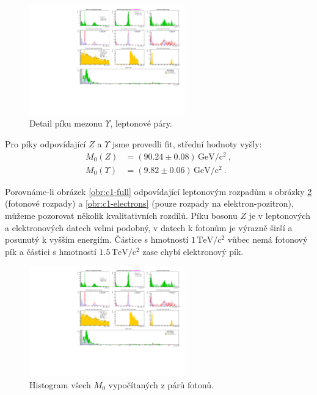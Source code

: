\documentclass[10pt,a4paper]{article}
\renewcommand{\U}[1]{\ensuremath{\,\mathrm{#1}}}
\newcommand{\°}{\degree}
\begin{document}
\begin{figure}[h]
    \centering
    \includegraphics[width=0.6\textwidth]{c1_Y.pdf}
    \vspace{-\baselineskip}
    \caption{Detail píku mezonu $\Upsilon$, leptonové páry.}
    \label{obr:c1-Y}
\end{figure}

\noindent
Pro píky odpovídající $Z$ a $\Upsilon$ jsme provedli fit, střední hodnoty vyšly:
\begin{align*}
    M_0(Z) &= (90.24 \pm 0.08) \U{GeV/c^2} \: , \\
    M_0(\Upsilon) &= (9.82 \pm 0.06) \U{GeV/c^2} \: .
\end{align*}

Porovnáme-li obrázek \ref{obr:c1-full} odpovídající leptonovým rozpadům s obrázky \ref{obr:c1-photons} (fotonové rozpady) a \ref{obr:c1-electrons} (pouze rozpady na elektron-pozitron), můžeme pozorovat několik kvalitativních rozdílů. Píku bosonu $Z$ je v leptonových a elektronových datech velmi podobný, v datech k fotonům je výrazně širší a posunutý k vyšším energiím. Částice s hmotností $1 \U{TeV/c^2}$ vůbec nemá fotonový pík a částici s hmotností $1.5 \U{TeV/c^2}$ zase chybí elektronový pík.

\begin{figure}[h]
    \centering
    \includegraphics[width=0.6\textwidth]{c1_photons.pdf}
    \vspace{-\baselineskip}
    \caption{Histogram všech $M_0$ vypočítaných z párů fotonů.}
    \label{obr:c1-photons}
\end{figure}
\end{document}
